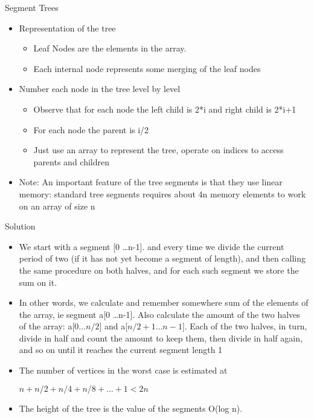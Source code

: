 \documentclass{beamer}
\begin{document}
\begin{frame}[<+->]{Segment Trees}
\begin{block}{}
    \begin{itemize}
	\item Representation of the tree\\
	\begin{itemize}
	    \item Leaf Nodes are the elements in the array.
	    \item Each internal node represents some merging of the leaf nodes
	\end{itemize}
	\item Number each node in the tree level by level\\
	\begin{itemize}
	    \item Observe that for each node the left child is 2*i and right child is 2*i+1
	    \item For each node the parent is i/2
	    \item Just use an array to represent the tree, operate on indices to access parents and children
	\end{itemize}
	\item \alert{Note: An important feature of the tree segments is that they use linear memory: standard tree segments requires about 4n memory elements to work on an array of size n}
    \end{itemize}
\end{block}
\end{frame}

\begin{frame}[<+->]{Solution}
\begin{block}{}
    \begin{itemize}
	\item We start with a segment [0 \ldots n-1]. and every time we divide the current period of two (if it has not yet become a segment of length), and then calling the same procedure on both halves, and for each such segment we store the sum on it.
	\item In other words, we calculate and remember somewhere sum of the elements of the array, ie segment a[0 \ldots n-1]. Also calculate the amount of the two halves of the array: a[$0 \ldots n/ 2$] and a[$n/2+1 \ldots n-1$]. Each of the two halves, in turn, divide in half and count the amount to keep them, then divide in half again, and so on until it reaches the current segment length 1
	\item The number of vertices in the worst case is estimated at
	\begin{center}$n+n/2+n/4+n/8+\dots+1<2n$\end{center}
	\item The height of the tree is the value of the segments O(log n).
    \end{itemize}
\end{block}
\end{frame}
\end{document}

